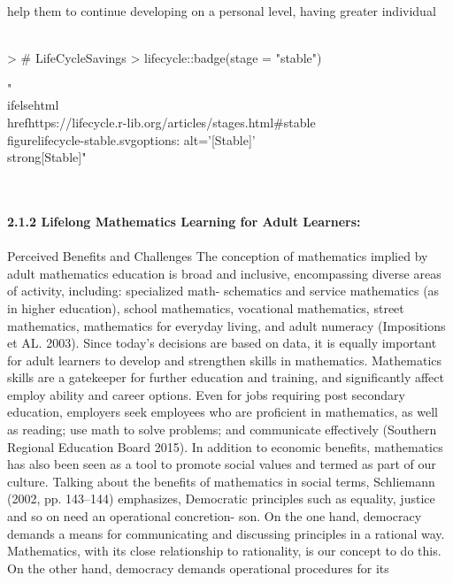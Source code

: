 \documentclass{article}
\begin{document}
help them to continue developing on a personal level, having greater individual
\textit{\\\\}
\begin{Schunk}
\begin{Sinput}
> # LifeCycleSavings 
> lifecycle::badge(stage = "stable")
\end{Sinput}
\begin{Soutput}
[1] "\\ifelse{html}{\\href{https://lifecycle.r-lib.org/articles/stages.html#stable}{\\figure{lifecycle-stable.svg}{options: alt='[Stable]'}}}{\\strong{[Stable]}}"
\end{Soutput}
\end{Schunk}
\textit{\\\\}
\textbf{ 2.1.2 Lifelong Mathematics Learning for Adult Learners: }
\textit{\\\\}
   Perceived Benefits and Challenges
The conception of mathematics implied by adult mathematics education is broad
and inclusive, encompassing diverse areas of activity, including: specialized math-
   schematics and service mathematics (as in higher education), school mathematics,
vocational mathematics, street mathematics, mathematics for everyday living,
and adult numeracy (Impositions et AL. 2003). Since today’s decisions are based
on data, it is equally important for adult learners to develop and strengthen skills
in mathematics. Mathematics skills are a gatekeeper for further education and
training, and significantly affect employ ability and career options. Even for jobs
requiring post secondary education, employers seek employees who are proficient
in mathematics, as well as reading; use math to solve problems; and communicate
effectively (Southern Regional Education Board 2015). In addition to economic
benefits, mathematics has also been seen as a tool to promote social values and
termed as part of our culture. Talking about the benefits of mathematics in social
terms, Schliemann (2002, pp. 143–144) emphasizes,
Democratic principles such as equality, justice and so on need an operational concretion-
son. On the one hand, democracy demands a means for communicating and discussing
principles in a rational way. Mathematics, with its close relationship to rationality, is our
concept to do this. On the other hand, democracy demands operational procedures for its
\end{document}
